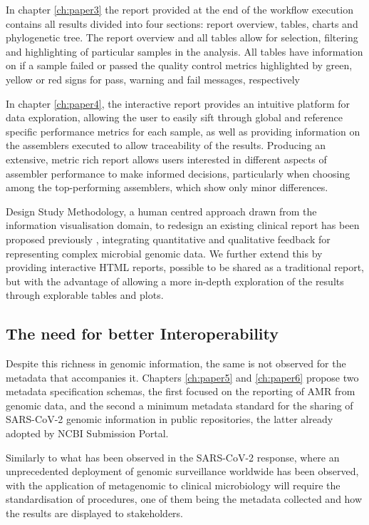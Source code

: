 In chapter \ref{ch:paper3} the report provided at the end of the workflow execution contains all results divided into four sections: report overview, tables, charts and phylogenetic tree. The report overview and all tables allow for selection, filtering and highlighting of particular samples in the analysis. All tables have information on if a sample failed or passed the quality control metrics highlighted by green, yellow or red signs for pass, warning and fail messages, respectively

In chapter \ref{ch:paper4}, the interactive report provides an intuitive platform for data exploration, allowing the user to easily sift through global and reference specific performance metrics for each sample, as well as providing information on the assemblers executed to allow traceability of the results. Producing an extensive, metric rich report allows users interested in different aspects of assembler performance to make informed decisions, particularly when choosing among the top-performing assemblers, which show only minor differences.

Design Study Methodology, a human centred approach drawn from the information visualisation domain, to redesign an existing clinical report has been proposed previously \citep{crisan_evidence-based_2018}, integrating quantitative and qualitative feedback for representing complex microbial genomic data. We further extend this by providing interactive HTML reports, possible to be shared as a traditional report, but with the advantage of allowing a more in-depth exploration of the results through explorable tables and plots. 

\subsection{The need for better Interoperability}

Despite this richness in genomic information, the same is not observed for the metadata that accompanies it. Chapters \ref{ch:paper5} and \ref{ch:paper6} propose two metadata specification schemas, the first focused on the reporting of \ac{AMR} from genomic data, and the second a minimum metadata standard for the sharing of \ac{SARS-CoV-2} genomic information in public repositories, the latter already adopted by NCBI Submission Portal. 

Similarly to what has been observed in the \ac{SARS-CoV-2} response, where an unprecedented deployment of genomic surveillance worldwide has been observed, with the application of metagenomic to clinical microbiology will require the standardisation of procedures, one of them being the metadata collected and how the results are displayed to stakeholders. 

